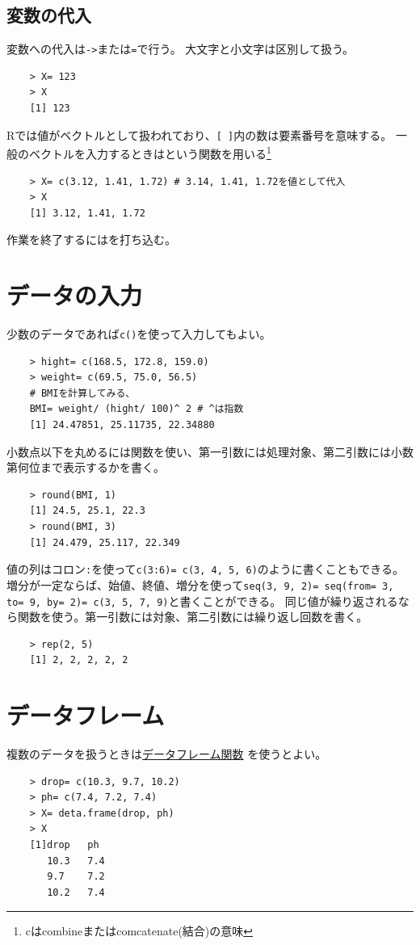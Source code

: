 \documentclass[uplatex,dvipdfmx,a4paper,12pt]{jsreport}
\begin{document}
\subsection{変数の代入}
    変数への代入は\texttt{->}または\texttt{=}で行う。
    大文字と小文字は区別して扱う。
\begin{verbatim}
    > X= 123
    > X
    [1] 123
\end{verbatim}

    Rでは値がベクトルとして扱われており、\texttt{[\ ]}内の数は要素番号を意味する。
    一般のベクトルを入力するときはという関数を用いる\footnote{cはcombineまたはcomcatenate(結合)の意味}

\begin{verbatim}
    > X= c(3.12, 1.41, 1.72) # 3.14, 1.41, 1.72を値として代入
    > X
    [1] 3.12, 1.41, 1.72
\end{verbatim}

    作業を終了するにはを打ち込む。

\section{データの入力}
    少数のデータであれば\texttt{c()}を使って入力してもよい。
\begin{verbatim}
    > hight= c(168.5, 172.8, 159.0)
    > weight= c(69.5, 75.0, 56.5)
    # BMIを計算してみる、
    BMI= weight/ (hight/ 100)^ 2 # ^は指数
    [1] 24.47851, 25.11735, 22.34880
\end{verbatim}
    小数点以下を丸めるには関数を使い、第一引数には処理対象、第二引数には小数第何位まで表示するかを書く。
\begin{verbatim}
    > round(BMI, 1)
    [1] 24.5, 25.1, 22.3
    > round(BMI, 3)
    [1] 24.479, 25.117, 22.349
\end{verbatim}
    値の列はコロン\texttt{:}を使って\texttt{c(3:6)= c(3, 4, 5, 6)}のように書くこともできる。\\
    増分が一定ならば、始値、終値、増分を使って\texttt{seq(3, 9, 2)= seq(from= 3, to= 9, by= 2)= c(3, 5, 7, 9)}と書くことができる。
    同じ値が繰り返されるなら関数を使う。第一引数には対象、第二引数には繰り返し回数を書く。
\begin{verbatim}
    > rep(2, 5)
    [1] 2, 2, 2, 2, 2
\end{verbatim}

\section{データフレーム}
    複数のデータを扱うときは\underline{データフレーム関数} を使うとよい。
\begin{verbatim}
    > drop= c(10.3, 9.7, 10.2)
    > ph= c(7.4, 7.2, 7.4)
    > X= deta.frame(drop, ph)
    > X
    [1]drop   ph
       10.3   7.4
       9.7    7.2
       10.2   7.4
\end{verbatim}
\end{document}
